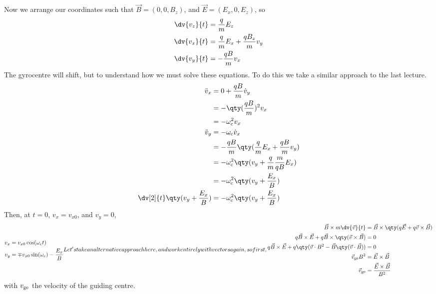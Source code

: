 \documentclass{book}         		                %
\begin{document}
Now we arrange our coordinates such that
$\vec{B}=(0,0, B_z)$, and $\vec{E} = (E_x, 0, E_z)$, so
\begin{subequations}
\begin{align}
\dv{v_z}{t} & = \frac{q}{m} E_z                                              \\
\dv{v_x}{t} & = \frac{q}{m} E_x + \frac{qB_z}{m} v_y                         \\
\dv{v_y}{t} & = - \frac{qB}{m} v_x 
\end{align}
\end{subequations}
The gyrocentre will shift, but to understand how we must solve these equations.
To do this we take a similar approach to the last lecture.
\begin{align*}
\ddot{v}_x  & = 0 + \frac{qB}{m} \dot{v}_y                                   \\
            & = - \qty(\frac{qB}{m})^2 v_x                                   \\
            & = - \omega_{\rm c}^2 v_x                                       \\
\ddot{v}_y  & = -\omega_{\rm c} \dot{v}_x                                    \\
            & = - \frac{qB}{m} \qty( \frac{q}{m} E_x + \frac{qB}{m} v_y )    \\
            & = -\omega_{\rm c}^2 \qty( v_y + \frac{q}{m} \frac{m}{qB} E_x ) \\
            & = - \omega_{\rm c}^2 \qty( v_y + \frac{E_x}{B} )               \\
\dv[2]{t}\qty( v_y + \frac{E_x}{B} ) &= - \omega_{\rm c}^2 \qty( v_y + \frac{E_x}{B} ) 
\end{align*}
Then, at $t=0$, $v_x = v_{x0}$, and $v_y=0$,
\begin{subequations}
\begin{align}
v_x &= v_{x0} \cos(\omega_{\rm c} t) \\
v_y &= \mp v_{x0} \sin(\omega_{\rm c}) - \frac{E_x}{B} 
\end{align}

Let's take an alternative approach here, and work entirely with vectors again, so first,
\begin{align}
\vec{B} \times m \dv{\vec{v}}{t} &= \vec{B} \times \qty(q \vec{E} + q \vec{v} \times \vec{B})  \nonumber \\
q \vec{B} \times \vec{E} + q \vec{B} \times \qty( \vec{v} \times \vec{B}) &= 0  \nonumber \\
q \vec{B} \times \vec{E} + q \qty(\vec{v} \cdot B^2 - \vec{B} \qty( \vec{v} \cdot \vec{B})) &= 0  \nonumber\\
\vec{v}_{\rm ge} B^2 &= \vec{E} \times \vec{B}  \nonumber\\
\vec{v}_{\rm ge} &= \frac{\vec{E} \times \vec{B}}{B^2} 
\end{align}
\end{subequations}
with $v_{\rm ge}$ the velocity of the guiding centre.
\end{document}

